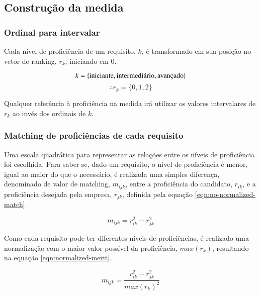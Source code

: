 \documentclass[preprint,12pt]{elsarticle}
\begin{document}


\subsection{Construção da medida}


\subsubsection{Ordinal para intervalar}
\label{sssec:ordinal-interval}
Cada nível de proficiência de um requisito, $k$, é transformado em sua posição no vetor de ranking, $r_k$, iniciando em 0.
    
$$\\k = \{ \text{iniciante}, \text{intermediário}, \text{avançado} \}$$ 
$$ \therefore r_k = \{ 0, 1, 2 \} $$

Qualquer referência à proficiência na medida irá utilizar os valores intervalares de $r_k$ ao invés dos ordinais de $k$.

\subsubsection{Matching de proficiências de cada requisito}
\label{sssec:matching}
Uma escala quadrática para representar as relações entre os níveis de proficiência foi escolhida. Para saber se, dado um requisito, o nível de proficiência é menor, igual ao maior do que o necessário, é realizada uma simples diferença, denominado de valor de matching, $m_{ijk}$, entre a proficiência do candidato, $r_{ik}$, e a proficiência desejada pela empresa, $r_{jk}$, definida pela equação \ref{eqn:no-normalized-match}.
    
\begin{equation}
\label{eqn:no-normalized-match}
   m_{ijk} = r_{ik}^2 - r_{jk}^2
\end{equation}

Como cada requisito pode ter diferentes níveis de proficiências, é realizado uma normalização com o maior valor possível da proficiência, $max(r_k)$, resultando na equação \ref{eqn:normalized-merit}.
    
\begin{equation}
\label{eqn:normalized-merit}
m_{ijk} = \frac{r_{ik}^2 - r_{jk}^2}{max(r_k)^2}
\end{equation}
\end{document}
